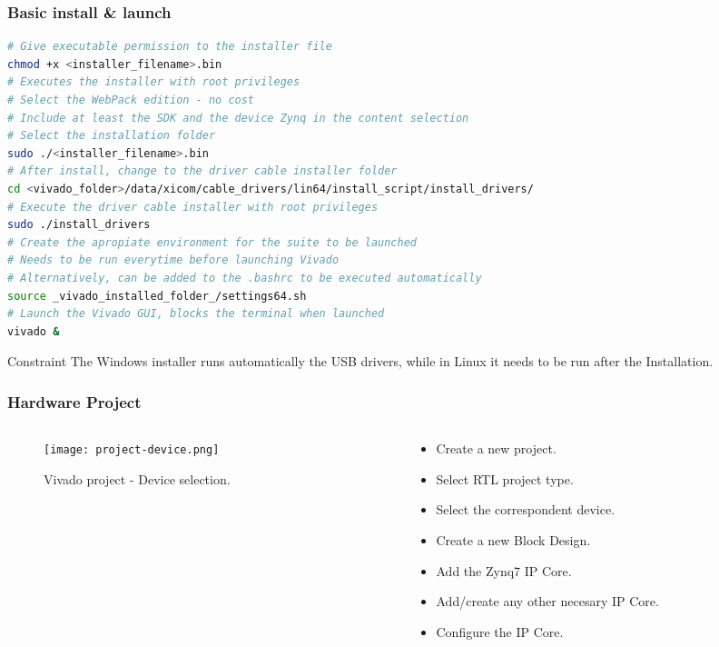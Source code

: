 \begin{frame}[fragile]
	\frametitle{Basic install \& launch}
	\begin{lstlisting}[language=bash, basicstyle=\tiny\ttfamily, tabsize=2, commentstyle=\color{darkgray}, keywordstyle=\color{blue}, backgroundcolor=\color{lightgray}, morekeywords={chmod, sudo}, breaklines=true]
# Give executable permission to the installer file
chmod +x <installer_filename>.bin
# Executes the installer with root privileges
# Select the WebPack edition - no cost
# Include at least the SDK and the device Zynq in the content selection
# Select the installation folder
sudo ./<installer_filename>.bin
# After install, change to the driver cable installer folder
cd <vivado_folder>/data/xicom/cable_drivers/lin64/install_script/install_drivers/
# Execute the driver cable installer with root privileges
sudo ./install_drivers
# Create the apropiate environment for the suite to be launched
# Needs to be run everytime before launching Vivado
# Alternatively, can be added to the .bashrc to be executed automatically
source _vivado_installed_folder_/settings64.sh
# Launch the Vivado GUI, blocks the terminal when launched
vivado &
	\end{lstlisting}
	\begin{alertblock}{Constraint}
		{\small The Windows installer runs automatically the USB drivers, while in Linux it needs to be run after the Installation.}
	\end{alertblock}
\end{frame}

\begin{frame}
	\frametitle{Hardware Project}
	\begin{columns}
		\begin{column}{0.5\textwidth}
			\begin{figure}
				\texttt{[image: project-device.png]}
				\caption{Vivado project - Device selection.}\label{fig:project-device}
			\end{figure}
		\end{column}
		\begin{column}{0.5\textwidth}
			\begin{itemize}
				\item Create a new project.
				\item Select RTL project type.
				\item Select the correspondent device.
				\item Create a new Block Design.
				\item Add the Zynq7 IP Core.
				\item Add/create any other necesary IP Core.
				\item Configure the IP Core.
			\end{itemize}
		\end{column}
	\end{columns}
\end{frame}

